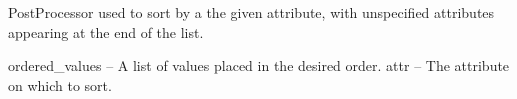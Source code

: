 \documentclass[letterpaper,10pt,english]{sphinxmanual}
\begin{document}

\begin{fulllineitems}
\label{index:omgeo.processors.postprocessors.AttrSorter}
PostProcessor used to sort by a the given attribute, with unspecified
attributes appearing at the end of the list.

ordered\_values   --  A list of values placed in the desired order.
attr             --  The attribute on which to sort.

\end{fulllineitems}

\end{document}
